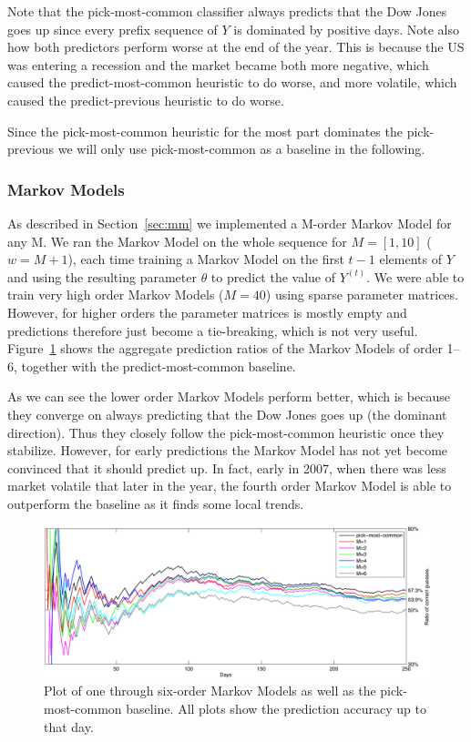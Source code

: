 \documentclass[10pt, twocolumn]{article}
\begin{document}
Note that the pick-most-common classifier always predicts that the Dow Jones goes up since every prefix sequence of $Y$ is dominated by positive days. 
Note also how both predictors perform worse at the end of the year.
This is because the US was entering a recession and the market became both more negative, which caused the predict-most-common heuristic to do worse, and more volatile, which caused the predict-previous heuristic to do worse.

Since the pick-most-common heuristic for the most part dominates the pick-previous we will only use pick-most-common as a baseline in the following.


\subsubsection{Markov Models}
\label{mm-eval}

As described in Section~\ref{sec:mm} we implemented a M-order Markov Model for any M.
We ran the Markov Model on the whole sequence for $M=[1,10]$ ($w=M+1$), each time training a Markov Model on the first $t-1$ elements of $Y$ and using the resulting parameter $\theta$ to predict the value of $Y^{(t)}$.
We were able to train very high order Markov Models ($M=40$) using sparse parameter matrices.
However, for higher orders the parameter matrices is mostly empty and predictions therefore just become a tie-breaking, which is not very useful.
Figure~\ref{fig:mm-experiment} shows the aggregate prediction ratios of the Markov Models of order 1--6, together with the predict-most-common baseline.

As we can see the lower order Markov Models perform better, which is because they converge on always predicting that the Dow Jones goes up (the dominant direction). Thus they closely follow the pick-most-common heuristic once they stabilize.
However, for early predictions the Markov Model has not yet become convinced that it should predict up. In fact, early in 2007, when there was less market volatile that later in the year, the fourth order Markov Model is able to outperform the baseline as it finds some local trends.

\begin{figure}
\center
\hspace{0.5cm}
\includegraphics[width=16cm]{experiments/mm_experiment.pdf}
\caption{Plot of one through six-order Markov Models as well as the pick-most-common baseline. All plots show the prediction accuracy up to that day.}
\label{fig:mm-experiment}
\end{figure}
\end{document}
